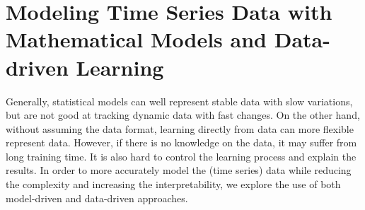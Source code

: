 \section{Modeling Time Series Data with Mathematical Models and Data-driven Learning}





 
 Generally, statistical models can well represent stable data with slow variations, but are not good at tracking dynamic data with fast changes. 
On the other hand,  without assuming the data format, learning directly from data can more flexible represent data. However, if there is no knowledge on the data,  it may suffer from long training time. It is also hard to control the learning process and explain the results.
 In order to more accurately model the (time series) data while reducing the complexity and increasing the interpretability, we explore the use of both  model-driven  and data-driven approaches. 
 
